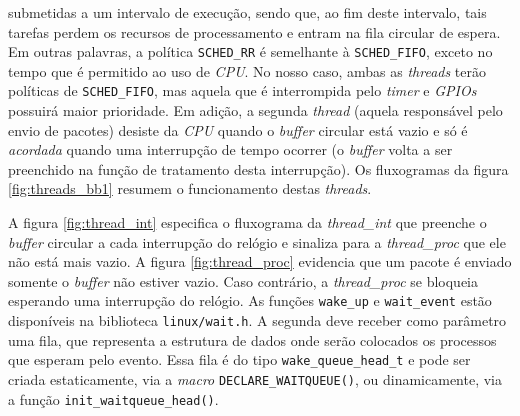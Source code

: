 submetidas a um intervalo de execução, sendo que, ao fim deste intervalo, tais
tarefas perdem os recursos de processamento e entram na fila circular de espera.
Em outras palavras, a política \texttt{SCHED\_RR} é semelhante à
\texttt{SCHED\_FIFO}, exceto no tempo que é permitido ao uso de \textit{CPU}. No
nosso caso, ambas as \textit{threads} terão políticas de \texttt{SCHED\_FIFO},
mas aquela que é interrompida pelo \textit{timer} e
\textit{GPIOs} possuirá maior prioridade. Em adição, a segunda \textit{thread}
(aquela responsável pelo envio de pacotes) desiste da \textit{CPU} quando o
\textit{buffer} circular está vazio e só é \textit{acordada} quando uma
interrupção de tempo ocorrer (o \textit{buffer} volta a ser preenchido na função de
tratamento desta interrupção). Os fluxogramas da figura \ref{fig:threads_bb1}
resumem o funcionamento destas \textit{threads}.

\vspace{12pt}

A figura \ref{fig:thread_int} especifica o fluxograma da \textit{thread\_int}
que preenche o \textit{buffer} circular a cada interrupção do relógio e sinaliza
para a \textit{thread\_proc} que ele não está mais vazio. A figura
\ref{fig:thread_proc} evidencia que um pacote é enviado somente o
\textit{buffer} não estiver vazio. Caso contrário, a \textit{thread\_proc}
se bloqueia esperando uma interrupção do relógio. As funções \texttt{wake\_up} e
\texttt{wait\_event} estão disponíveis na biblioteca \texttt{linux/wait.h}. A
segunda deve receber como parâmetro uma fila, que representa a estrutura de
dados onde serão colocados os processos que esperam pelo evento. Essa fila é do
tipo \texttt{wake\_queue\_head\_t} e pode ser criada estaticamente, via
a \textit{macro} \texttt{DECLARE\_WAITQUEUE()}, ou dinamicamente, via a função
\texttt{init\_waitqueue\_head()}.

